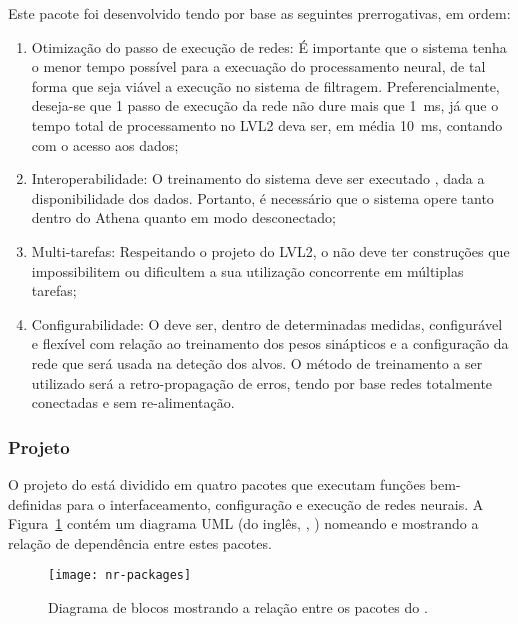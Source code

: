 Este pacote foi desenvolvido tendo por base as seguintes prerrogativas, em
ordem:

\begin{enumerate}
\item Otimização do passo de execução de redes: É importante que o sistema
tenha o menor tempo possível para a execuação do processamento neural, de tal
forma que seja viável a execução no sistema de filtragem. Preferencialmente,
deseja-se que 1 passo de execução da rede não dure mais que 1~ms, já que o
tempo total de processamento no LVL2 deva ser, em média 10~ms, contando com o
acesso aos dados;
\item Interoperabilidade: O treinamento do sistema deve ser executado
, dada a disponibilidade dos dados. Portanto, é necessário que o
sistema opere tanto dentro do  Athena quanto em modo
desconectado;
\item Multi-tarefas: Respeitando o projeto do LVL2, o  não
deve ter construções que impossibilitem ou dificultem a sua utilização
concorrente em múltiplas tarefas;
\item Configurabilidade: O  deve ser, dentro de determinadas
medidas, configurável e flexível com relação ao treinamento dos pesos
sinápticos e a configuração da rede que será usada na deteção dos alvos. O
método de treinamento a ser utilizado será a retro-propagação de erros, tendo
por base redes totalmente conectadas e sem re-alimentação.
\end{enumerate}

\subsubsection{Projeto}

O projeto do  está dividido em quatro pacotes que executam
funções bem-definidas para o interfaceamento, configuração e execução de redes
neurais. A Figura~\ref{fig:nr-packages} contém um diagrama UML (do inglês,
, \cite{booch}) nomeando e
mostrando a relação de dependência entre estes pacotes.

\begin{figure}
\begin{center}
\texttt{[image: nr-packages]}
\end{center}
\caption{Diagrama de blocos mostrando a relação entre os pacotes do
.}
\label{fig:nr-packages}
\end{figure}

